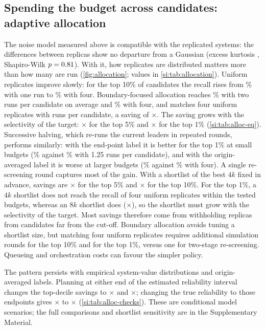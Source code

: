 \documentclass[preprint,12pt]{elsarticle}
\begin{document}
\subsection{Spending the budget across candidates: adaptive allocation}\label{sec:res-allocation}
The noise model measured above is compatible with the replicated systems: the
differences between replicas show no departure from a Gaussian (excess kurtosis \alKurt,
Shapiro-Wilk $p=0.81$).
With it, how replicates are distributed matters more than how many are run (\cref{fig:allocation};
values in \cref{si:tab:allocation}). Uniform replicates improve slowly: for the top 10\% of \alN{} candidates
the recall rises from \alUnifTopTenBOne\% with one run to \alUnifTopTenBFour\% with four.
Boundary-focused allocation reaches \alBoundTopTenBTwo\% with two runs per candidate on average
and \alBoundTopTenBFour\% with four, and matches four uniform replicates with
\alEqTopTenUnifFour{} runs per candidate, a saving of $\times$\alSavingTopTenUnifFour. The saving
grows with the selectivity of the target: $\times$\alSavingTopFiveUnifFour{} for the top 5\% and
$\times$\alSavingTopOneUnifFour{} for the top 1\% (\cref{si:tab:alloc-eq}). Successive halving, which re-runs the current leaders in repeated rounds, performs
similarly: with the end-point label it is better for the top 1\% at small budgets
(\alHalvingTopOneBOneQuarterEnd\% against \alBoundTopOneBOneQuarterEnd\% with 1.25 runs per
candidate), and with the origin-averaged label it is worse at larger budgets
(\alHalvingTopOneBFourAvg\% against \alBoundTopOneBFourAvg\% with four).
A single re-screening round captures most of the gain. With a shortlist of the best $4k$
fixed in advance, savings are $\times$\alTwoStageFourkSavingTopFive{} for the top 5\% and
$\times$\alTwoStageFourkSavingTopTen{} for the top 10\%. For the top 1\%, a $4k$ shortlist
does not reach the recall of four uniform replicates within the tested budgets, whereas an
$8k$ shortlist does ($\times$\alTwoStageEightkSavingTopOne), so the shortlist must grow with
the selectivity of the target. Most savings therefore come from
withholding replicas from candidates far from the cut-off. Boundary allocation avoids tuning
a shortlist size, but matching four uniform replicates requires \alRoundsTopTen{} additional
simulation rounds for the top 10\% and \alRoundsTopOne{} for the top 1\%, versus one for
two-stage re-screening. Queueing and orchestration costs can favour the simpler policy.

The pattern persists with empirical system-value distributions and origin-averaged labels.
Planning at either end of the estimated reliability interval changes the top-decile savings
to $\times$\alMisLoSavingTopTen{} and $\times$\alMisHiSavingTopTen{}; changing the true
reliability to those endpoints gives $\times$\alTrueLoSavingTopTen{} to
$\times$\alTrueHiSavingTopTen{} (\cref{si:tab:alloc-checks}). These are conditional model
scenarios; the full comparisons and shortlist sensitivity are in the Supplementary Material.
\end{document}
